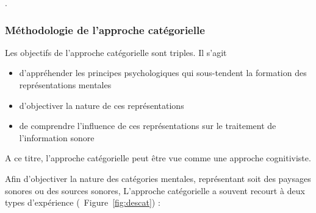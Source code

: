 .

\subsubsection{Méthodologie de l'approche catégorielle}
\label{sec:appCategorielle}

Les objectifs de l'approche catégorielle sont triples. Il s'agit 

\begin{itemize}
\item d'appréhender les principes psychologiques qui sous-tendent la formation des représentations mentales
\item d'objectiver la nature de ces représentations
\item de comprendre l'influence de ces représentations sur le traitement de l'information sonore
\end{itemize}
 
A ce titre, l'approche catégorielle peut être vue comme une approche cognitiviste. 

Afin d'objectiver la nature des catégories mentales, représentant soit des paysages sonores ou des sources sonores, L'approche catégorielle a souvent recourt à deux types d'expérience (\Cf~Figure~\ref{fig:descat}) :

